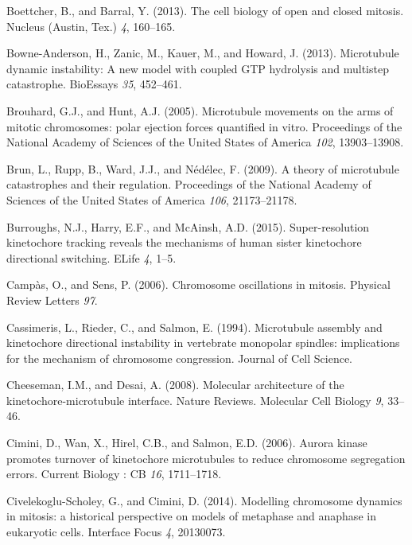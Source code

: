 \documentclass[12pt,a4paper,twoside,openright]{book}
\begin{document}
Boettcher, B., and Barral, Y. (2013). The cell biology of open and
closed mitosis. Nucleus (Austin, Tex.) \emph{4}, 160--165.

Bowne-Anderson, H., Zanic, M., Kauer, M., and Howard, J. (2013).
Microtubule dynamic instability: A new model with coupled GTP hydrolysis
and multistep catastrophe. BioEssays \emph{35}, 452--461.

Brouhard, G.J., and Hunt, A.J. (2005). Microtubule movements on the arms
of mitotic chromosomes: polar ejection forces quantified in vitro.
Proceedings of the National Academy of Sciences of the United States of
America \emph{102}, 13903--13908.

Brun, L., Rupp, B., Ward, J.J., and Nédélec, F. (2009). A theory of
microtubule catastrophes and their regulation. Proceedings of the
National Academy of Sciences of the United States of America \emph{106},
21173--21178.

Burroughs, N.J., Harry, E.F., and McAinsh, A.D. (2015). Super-resolution
kinetochore tracking reveals the mechanisms of human sister kinetochore
directional switching. ELife \emph{4}, 1--5.

Campàs, O., and Sens, P. (2006). Chromosome oscillations in mitosis.
Physical Review Letters \emph{97}.

Cassimeris, L., Rieder, C., and Salmon, E. (1994). Microtubule assembly
and kinetochore directional instability in vertebrate monopolar
spindles: implications for the mechanism of chromosome congression.
Journal of Cell Science.

Cheeseman, I.M., and Desai, A. (2008). Molecular architecture of the
kinetochore-microtubule interface. Nature Reviews. Molecular Cell
Biology \emph{9}, 33--46.

Cimini, D., Wan, X., Hirel, C.B., and Salmon, E.D. (2006). Aurora kinase
promotes turnover of kinetochore microtubules to reduce chromosome
segregation errors. Current Biology : CB \emph{16}, 1711--1718.

Civelekoglu-Scholey, G., and Cimini, D. (2014). Modelling chromosome
dynamics in mitosis: a historical perspective on models of metaphase and
anaphase in eukaryotic cells. Interface Focus \emph{4}, 20130073.
\end{document}
